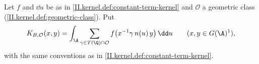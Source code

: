 Let $f$ and $\dd u$ be as in \cref{II.kernel.def:constant-term-kernel} and $\mathcal O$ a geometric class (\cref{II.kernel.def:geometric-class}). Put
\[
  K_{B,\mathcal O}(x,y)=\int_\A\sum_{\gamma\in T(\Q)\cap\mathcal O}f\bigl(x^{-1}\gamma\,n(u)\,y\bigr)\,\dd u\qquad(x,y\in G(\A)^1),
\]
with the same conventions as in \cref{II.kernel.def:constant-term-kernel}.
